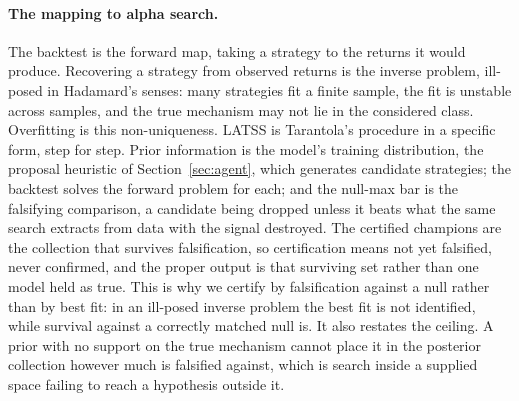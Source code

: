\documentclass[11pt]{article}
\begin{document}
\paragraph{The mapping to alpha search.} The backtest is the forward map, taking a strategy to the
returns it would produce. Recovering a strategy from observed returns is the inverse problem, ill-posed
in Hadamard's senses: many strategies fit a finite sample, the fit is unstable across samples, and the
true mechanism may not lie in the considered class. Overfitting is this non-uniqueness. LATSS is
Tarantola's procedure in a specific form, step for step. Prior information is the model's training
distribution, the proposal heuristic of Section~\ref{sec:agent}, which generates candidate strategies;
the backtest solves the forward problem for each; and the null-max bar is the falsifying comparison, a
candidate being dropped unless it beats what the same search extracts from data with the signal
destroyed. The certified champions are the collection that survives falsification, so certification
means not yet falsified, never confirmed, and the proper output is that surviving set rather than one
model held as true. This is why we certify by falsification against a null rather than by best fit: in
an ill-posed inverse problem the best fit is not identified, while survival against a correctly matched
null is. It also restates the ceiling. A prior with no support on the true mechanism cannot place it in
the posterior collection however much is falsified against, which is search inside a supplied space
failing to reach a hypothesis outside it.
\end{document}
